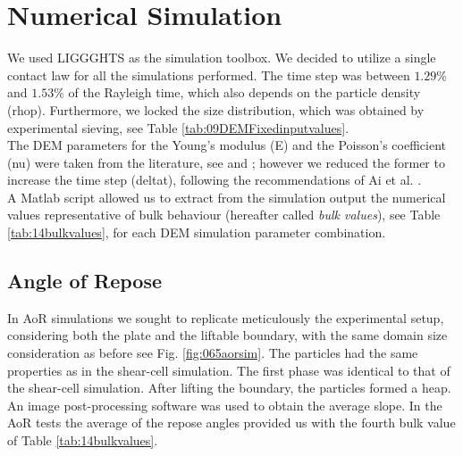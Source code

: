 
\chapter{Numerical Simulation}
\label{cap:numericalsimulation}


We used \acs{LIGGGHTS} as the simulation toolbox.
We decided to utilize a single
contact law for all the simulations performed.
The time step was between $1.29 \%$ and $1.53 \%$ of the Rayleigh time, which
also depends on the particle density (\acs{rhop}).
Furthermore, we locked the size distribution, which was obtained by experimental
sieving, see Table \ref{tab:09DEMFixedinputvalues}.\\
The \acs{DEM} parameters for the Young's modulus (\acs{E}) and the Poisson's coefficient
(\acs{nu}) were taken from the literature, see \cite{RefWorks:175} 
and \cite{RefWorks:176}; however we reduced the former to increase the time step
(\acs{deltat}), following the recommendations of Ai et al.
\cite{RefWorks:131}.\\
A Matlab script allowed us to extract from the simulation output the numerical
values representative of bulk behaviour (hereafter called \textit{bulk values}),
see Table \ref{tab:14bulkvalues},
for each \acs{DEM} simulation parameter combination.



\section{Angle of Repose}
\label{sec:aorsim}

In \acs{AoR} simulations we sought to replicate meticulously the experimental setup, 
considering both the plate and the liftable boundary, with the same domain size consideration as before
see Fig. \ref{fig:065aorsim}. 
The particles had the same properties as in the shear-cell simulation. 
The first phase was identical to that of the shear-cell simulation. 
After lifting the boundary, the particles formed a heap.
An image post-processing software was used to obtain the average slope.
In the \acs{AoR} tests the average of the repose angles provided us with the fourth
bulk value of Table \ref{tab:14bulkvalues}.


